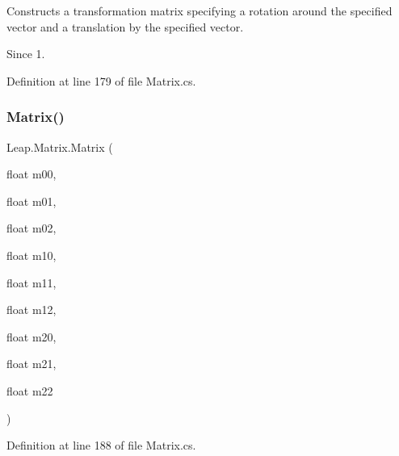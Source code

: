 Constructs a transformation matrix specifying a rotation around the specified vector and a translation by the specified vector. 

\begin{DoxySince}{Since}
1. 
\end{DoxySince}


Definition at line 179 of file Matrix.\+cs.

\mbox{\label{struct_leap_1_1_matrix_aacb0b99975e8a07a8782098c3152be4a}} 
\subsubsection{\texorpdfstring{Matrix()}{Matrix()}\hspace{0.1cm}{\footnotesize\ttfamily [6/7]}}
{\footnotesize\ttfamily Leap.\+Matrix.\+Matrix (\begin{DoxyParamCaption}\item[{float}]{m00,  }\item[{float}]{m01,  }\item[{float}]{m02,  }\item[{float}]{m10,  }\item[{float}]{m11,  }\item[{float}]{m12,  }\item[{float}]{m20,  }\item[{float}]{m21,  }\item[{float}]{m22 }\end{DoxyParamCaption})}



Definition at line 188 of file Matrix.\+cs.

\mbox{\label{struct_leap_1_1_matrix_a8e3ea3f6969752cdea11bf23215bd9e2}} 
